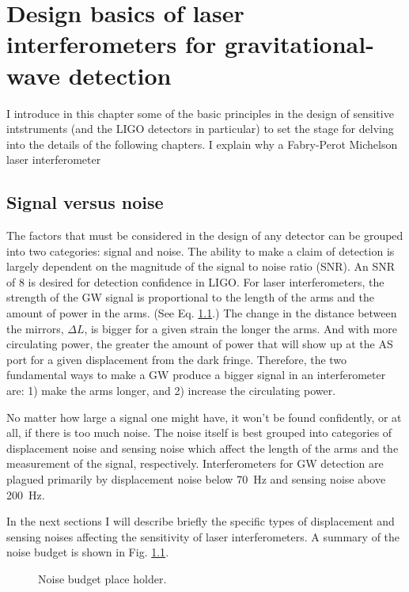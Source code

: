 \chapter{Design basics of laser interferometers for gravitational-wave detection}
I introduce in this chapter some of the basic principles in the
design of sensitive intstruments (and the LIGO detectors in
particular) to set the stage for delving into the details of the
following chapters. I explain why a Fabry-Perot Michelson laser
interferometer 


\section{Signal versus noise}
The factors that must be considered in the design of any detector can
be grouped into two categories: signal and noise. The ability to make
a claim of detection is largely dependent on the magnitude of the
signal to noise ratio (SNR). An SNR of 8 is desired for detection
confidence in LIGO. For laser interferometers, the strength of the GW
signal is proportional to the length of the arms and the amount of
power in the arms. (See Eq. \ref{}.) The change in the distance
between the mirrors, $\Delta L$, is bigger for a given strain the
longer the arms. And with more circulating power, the greater the
amount of power that will show up at the AS port for a given
displacement from the dark fringe. Therefore, the two fundamental ways
to make a GW produce a bigger signal in an interferometer are: 1) make
the arms longer, and 2) increase the circulating power.

No matter how large a signal one might have, it won't be found
confidently, or at all, if there is too much noise. The noise itself
is best grouped into categories of displacement noise and sensing
noise which affect the length of the arms and the measurement of the
signal, respectively. Interferometers for GW detection are plagued
primarily by displacement noise below 70~Hz and sensing noise above
200~Hz.

In the next sections I will describe briefly the specific types of
displacement and sensing noises affecting the sensitivity of laser
interferometers. A summary of the noise budget is shown in
Fig. \ref{fig:NB}. 


\begin{figure}
\begin{centering}
\caption[LIGO noise budget]{Noise budget place holder.}
\label{fig:NB}
\end{centering}
\end{figure}


